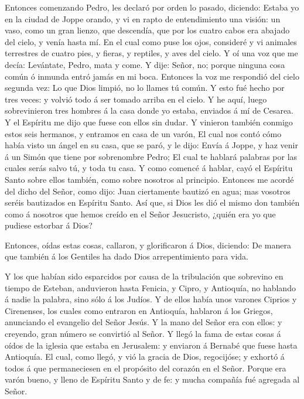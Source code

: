  Entonces comenzando Pedro, les declaró por orden lo pasado,
diciendo:  Estaba yo en la ciudad de Joppe orando, y vi en
rapto de entendimiento una visión: un vaso, como un gran lienzo, que
descendía, que por los cuatro cabos era abajado del cielo, y venía hasta
mí.  En el cual como puse los ojos, consideré y vi animales
terrestres de cuatro pies, y fieras, y reptiles, y aves del cielo.
 Y oí una voz que me decía: Levántate, Pedro, mata y come.
 Y dije: Señor, no; porque ninguna cosa común ó inmunda
entró jamás en mi boca.  Entonces la voz me respondió del
cielo segunda vez: Lo que Dios limpió, no lo llames tú común.
 Y esto fué hecho por tres veces: y volvió todo á ser
tomado arriba en el cielo.  Y he aquí, luego sobrevinieron
tres hombres á la casa donde yo estaba, enviados á mí de Cesarea.
 Y el Espíritu me dijo que fuese con ellos sin dudar. Y
vinieron también conmigo estos seis hermanos, y entramos en casa de un
varón,  El cual nos contó cómo había visto un ángel en su
casa, que se paró, y le dijo: Envía á Joppe, y haz venir á un Simón que
tiene por sobrenombre Pedro;  El cual te hablará palabras
por las cuales serás salvo tú, y toda tu casa.  Y como
comencé á hablar, cayó el Espíritu Santo sobre ellos también, como sobre
nosotros al principio.  Entonces me acordé del dicho del
Señor, como dijo: Juan ciertamente bautizó en agua; mas vosotros seréis
bautizados en Espíritu Santo.  Así que, si Dios les dió el
mismo don también como á nosotros que hemos creído en el Señor
Jesucristo, ¿quién era yo que pudiese estorbar á Dios?

 Entonces, oídas estas cosas, callaron, y glorificaron á
Dios, diciendo: De manera que también á los Gentiles ha dado Dios
arrepentimiento para vida.

 Y los que habían sido esparcidos por causa de la
tribulación que sobrevino en tiempo de Esteban, anduvieron hasta
Fenicia, y Cipro, y Antioquía, no hablando á nadie la palabra, sino sólo
á los Judíos.  Y de ellos había unos varones Ciprios y
Cirenenses, los cuales como entraron en Antioquía, hablaron á los
Griegos, anunciando el evangelio del Señor Jesús.  Y la
mano del Señor era con ellos: y creyendo, gran número se convirtió al
Señor.  Y llegó la fama de estas cosas á oídos de la
iglesia que estaba en Jerusalem: y enviaron á Bernabé que fuese hasta
Antioquía.  El cual, como llegó, y vió la gracia de Dios,
regocijóse; y exhortó á todos á que permaneciesen en el propósito del
corazón en el Señor.  Porque era varón bueno, y lleno de
Espíritu Santo y de fe: y mucha compañía fué agregada al Señor.

